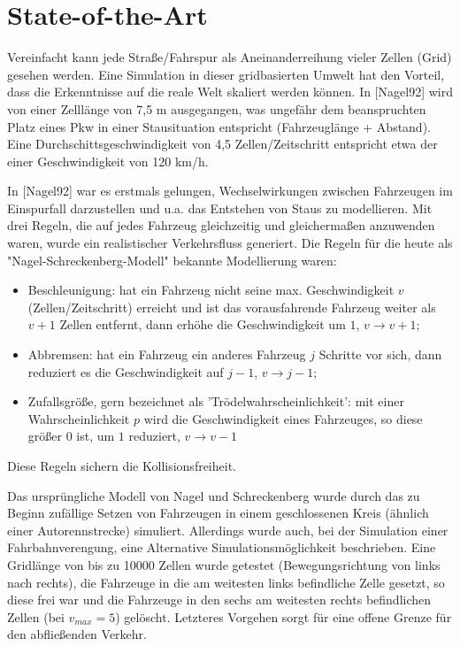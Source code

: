 \section{State-of-the-Art}
\label{sec:sota}

Vereinfacht kann jede Straße/Fahrspur als Aneinanderreihung vieler Zellen (Grid) gesehen werden. Eine Simulation in dieser gridbasierten Umwelt hat den Vorteil, dass die Erkenntnisse auf die reale Welt skaliert werden können. In [Nagel92] wird von einer Zelllänge von 7,5 m ausgegangen, was ungefähr dem beanspruchten Platz eines Pkw in einer Stausituation entspricht (Fahrzeuglänge + Abstand). Eine Durchschittsgeschwindigkeit von 4,5 Zellen/Zeitschritt entspricht etwa der einer Geschwindigkeit von 120 km/h.

In [Nagel92] war es erstmals gelungen, Wechselwirkungen zwischen Fahrzeugen im Einspurfall darzustellen und u.a. das Entstehen von Staus zu modellieren. Mit drei Regeln, die auf jedes Fahrzeug gleichzeitig und gleichermaßen anzuwenden waren, wurde ein realistischer Verkehrsfluss generiert. Die Regeln für die heute als "Nagel-Schreckenberg-Modell" bekannte Modellierung waren: 

\begin{itemize}
\item Beschleunigung: hat ein Fahrzeug nicht seine max. Geschwindigkeit $v$ (Zellen/Zeitschritt) erreicht und ist das vorausfahrende Fahrzeug weiter als $v+1$ Zellen entfernt, dann erhöhe die Geschwindigkeit um $1$, $v \rightarrow v+1$;
\item Abbremsen: hat ein Fahrzeug ein anderes Fahrzeug $j$ Schritte vor sich, dann reduziert es die Geschwindigkeit auf $j-1$, $v \rightarrow j-1$;
\item Zufallsgröße, gern bezeichnet als 'Trödelwahrscheinlichkeit': mit einer Wahrscheinlichkeit $p$ wird die Geschwindigkeit eines Fahrzeuges, so diese größer $0$ ist, um $1$ reduziert, $v \rightarrow v-1$
\end{itemize}

Diese Regeln sichern die Kollisionsfreiheit.

Das ursprüngliche Modell von Nagel und Schreckenberg wurde durch das zu Beginn zufällige Setzen von Fahrzeugen in einem geschlossenen Kreis (ähnlich einer Autorennstrecke) simuliert. Allerdings wurde auch, bei der Simulation einer Fahrbahnverengung, eine Alternative Simulationsmöglichkeit beschrieben. Eine Gridlänge von bis zu 10000 Zellen wurde getestet (Bewegungsrichtung von links nach rechts), die Fahrzeuge in die am weitesten links befindliche Zelle gesetzt, so diese frei war und die Fahrzeuge in den sechs am weitesten rechts befindlichen Zellen (bei $v_{max}=5$) gelöscht. Letzteres Vorgehen sorgt für eine offene Grenze für den abfließenden Verkehr.

